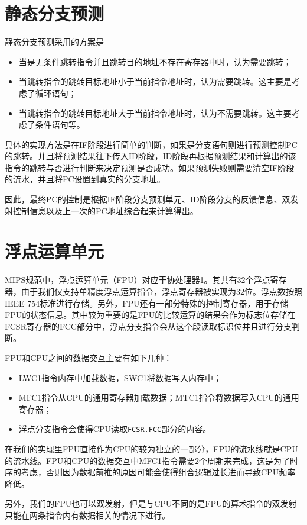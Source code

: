 \section{静态分支预测}
静态分支预测采用的方案是
\begin{itemize}
	\item 当是无条件跳转指令并且跳转目的地址不存在寄存器中时，认为需要跳转；
	\item 当跳转指令的跳转目标地址小于当前指令地址时，认为需要跳转。这主要是考虑了循环语句；
	\item 当跳转指令的跳转目标地址大于当前指令地址时，认为不需要跳转。这主要考虑了条件语句等。
\end{itemize}

具体的实现方法是在IF阶段进行简单的判断，如果是分支语句则进行预测控制PC的跳转。并且将预测结果往下传入ID阶段，ID阶段再根据预测结果和计算出的该指令的跳转与否进行判断来决定预测是否成功。如果预测失败则需要清空IF阶段的流水，并且将PC设置到真实的分支地址。

因此，最终PC的控制是根据IF阶段分支预测单元、ID阶段分支的反馈信息、双发射控制信息以及上一次的PC地址综合起来计算得出。

\section{浮点运算单元}
MIPS规范中，浮点运算单元（FPU）对应于协处理器1。其共有32个浮点寄存器，由于我们仅支持单精度浮点运算指令，浮点寄存器被实现为32位。浮点数按照IEEE 754标准进行存储。另外，FPU还有一部分特殊的控制寄存器，用于存储FPU的状态信息。其中较为重要的是FPU的比较运算的结果会作为标志位存储在FCSR寄存器的FCC部分中，浮点分支指令会从这个段读取标识位并且进行分支判断。

FPU和CPU之间的数据交互主要有如下几种：
\begin{itemize}
	\item LWC1指令内存中加载数据，SWC1将数据写入内存中；
	\item MFC1指令从CPU的通用寄存器加载数据；MTC1指令将数据写入CPU的通用寄存器；
	\item 浮点分支指令会使得CPU读取\texttt{FCSR.FCC}部分的内容。
\end{itemize}

在我们的实现里FPU直接作为CPU的较为独立的一部分，FPU的流水线就是CPU的流水线。FPU和CPU的数据交互中MFC1指令需要2个周期来完成，这是为了时序的考虑，否则因为数据前推的原因可能会使得组合逻辑过长进而导致CPU频率降低。

另外，我们的FPU也可以双发射，但是与CPU不同的是FPU的算术指令的双发射只能在两条指令内有数据相关的情况下进行。

